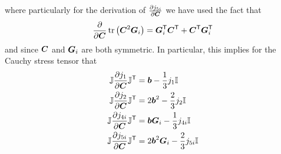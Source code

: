 \documentclass{article}
\begin{document}
where particularly for the derivation of $\frac{\partial j_{5i}}{\partial {\boldsymbol C}}$ we have used the fact that 
\begin{equation*}
\frac{\partial}{\partial {\boldsymbol C}} \operatorname{tr}\left({\boldsymbol C}^2 {\boldsymbol G}_i\right) = {\boldsymbol G}_i^{\mathsf T}{\boldsymbol C}^{\mathsf T} + {\boldsymbol C}^{\mathsf T}{\boldsymbol G}_i^{\mathsf T}
\end{equation*} 
and since ${\boldsymbol C}$ and ${\boldsymbol G}_i$ are both symmetric.
In particular, this implies for the Cauchy stress tensor that
\begin{subequations}
\begin{align}
   {\mathbb J} \frac{\partial j_1}{\partial {\boldsymbol C}} {\mathbb J}^{\mathsf T} &= {\boldsymbol b} -\frac{1}{3} j_1 {\mathbb I} \\
   {\mathbb J} \frac{\partial j_2}{\partial {\boldsymbol C}} {\mathbb J}^{\mathsf T} &= 2{\boldsymbol b}^2 -\frac{2}{3} j_2 {\mathbb I} \\
   {\mathbb J} \frac{\partial j_{4i}}{\partial {\boldsymbol C}} {\mathbb J}^{\mathsf T} &= {\boldsymbol b} {\boldsymbol G}_i - \frac{1}{3} j_{4i} {\mathbb I} \\
   {\mathbb J} \frac{\partial j_{5i}}{\partial {\boldsymbol C}} {\mathbb J}^{\mathsf T} &= 2{\boldsymbol b}^2{\boldsymbol G}_i -\frac{2}{3} j_{5i} {\mathbb I}
\end{align}
\end{subequations}
\end{document}
